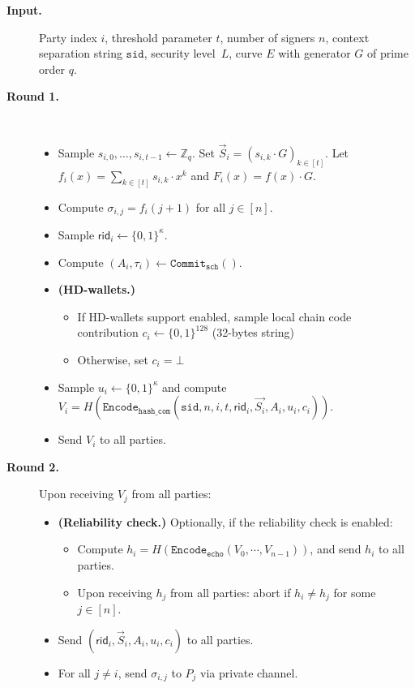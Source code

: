 \documentclass[11pt]{article}
\newcommand{\sid}{\ensuremath{\mathtt{sid}}}
\newcommand{\commit}[1]{\ensuremath{\mathtt{Commit}_{\mathtt{#1}}}}
\newcommand{\Encode}[1]{\ensuremath{\mathtt{Encode}_{\mathtt{#1}}}}
\newcommand{\rid}{\textsf{rid}}
\newcommand{\Z}{\mathbb{Z}}
\newcommand{\?}[1]{\stackrel{?}{#1}}
\begin{document}
\begin{description}

  \item[\textbf{Input.}]
    Party index $i$,
    threshold parameter $t$,
    number of signers $n$,
    context separation string $\sid$,
    security level~$L$,
    curve $E$ with generator $G$ of prime order $q$.

  \item[\textbf{Round 1.}] \
    \begin{itemize}
      \item Sample $s_{i,0}, \ldots, s_{i,{t-1}} \gets \Z_q$. 
            Set $\vec S_i = (s_{i,k} \cdot G)_{k \in [t]}$.
            Let $f_i(x) = \sum_{k \in [t]} s_{i,k} \cdot x^k$ and $F_i(x) = f(x) \cdot G$.
      \item Compute $\sigma_{i,j} = f_i(j + 1)$ for all $j \in [n]$.
      \item Sample $\rid_i \gets \{0,1\}^\kappa$.
      \item Compute $(A_i, \tau_i) \gets \commit{sch}()$. %
      \item {\bf (HD-wallets.)} 
      \begin{itemize}
        \item If HD-wallets support enabled, sample local chain code contribution $c_i \gets \{0,1\}^{128}$ (32-bytes string)
        \item Otherwise, set $c_i = \bot$
      \end{itemize}

      \item Sample $u_i \gets \{0,1\}^\kappa$
        and compute $V_i = H(\Encode{hash\_com}(\sid, n, i, t, \rid_i, \vec{S_i}, A_i, u_i, c_i))$.
      \item Send $V_i$ to all parties.
    \end{itemize}


  \item[\textbf{Round 2.}] 
 Upon receiving $V_j$ from all parties:
    \begin{itemize}
      \item {\bf (Reliability check.)} Optionally, if the reliability check is enabled:
    \begin{itemize}
        \item 
        Compute $h_i = H(\Encode{echo}(V_0, \cdots, V_{n-1}))$, and send $h_i$ to all parties.
        
        \item Upon receiving $h_j$ from all  parties: abort if 
        $h_i \neq h_j$ for some $j \in [n]$.
    \end{itemize}
      \item Send $(\rid_i, \vec{S}_i, A_i, u_i, c_i)$ to all parties.
      \item For all $j \neq i$, send $\sigma_{i,j}$ to $P_j$ via private channel.
    \end{itemize}


\end{description}
\end{document}
